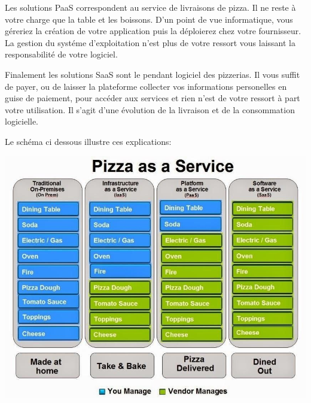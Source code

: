 \documentclass[11pt, a4paper ]{article}
\begin{document}
Les solutions PaaS correspondent au service de livraisons de pizza. Il ne reste à votre charge que la table et les boissons. D'un point de vue informatique, vous géreriez la création de votre application puis la déploierez chez votre fournisseur. La gestion du systéme d'exploitation n'est plus de votre ressort vous laissant la responsabilité de votre logiciel.

Finalement les solutions SaaS sont le pendant logiciel des pizzerias. Il vous suffit de payer, ou de laisser la plateforme collecter vos informations personelles en guise de paiement, pour accéder aux services et rien n'est de votre ressort à part votre utilisation. Il s'agit d'une évolution de la livraison et de la consommation logicielle.

Le schéma ci dessous illustre ces explications:

\includegraphics[width=\textwidth]{images/PizzaasaService.jpg}

\end{document}
